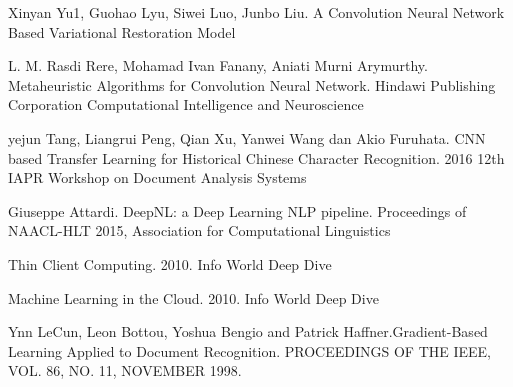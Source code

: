 \begin{thebibliography}{4}
 Xinyan Yu1, Guohao Lyu, Siwei Luo, Junbo Liu. A Convolution Neural Network Based Variational Restoration Model

 L. M. Rasdi Rere, Mohamad Ivan Fanany, Aniati Murni Arymurthy. Metaheuristic Algorithms for Convolution Neural Network. Hindawi Publishing Corporation Computational Intelligence and Neuroscience

 yejun Tang, Liangrui Peng, Qian Xu, Yanwei Wang dan Akio Furuhata. CNN based Transfer Learning for Historical Chinese Character Recognition. 2016 12th IAPR Workshop on Document Analysis Systems

 Giuseppe Attardi. DeepNL: a Deep Learning NLP pipeline. Proceedings of NAACL-HLT 2015, Association for Computational Linguistics

 Thin Client Computing. 2010. Info World Deep Dive

 Machine Learning in the Cloud. 2010. Info World Deep Dive

Ynn LeCun, Leon Bottou, Yoshua Bengio and Patrick Haffner.Gradient-Based Learning Applied to Document Recognition. PROCEEDINGS OF THE IEEE, VOL. 86, NO. 11, NOVEMBER 1998.

\end{thebibliography}

